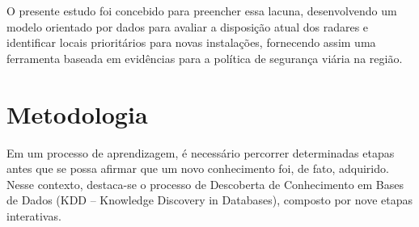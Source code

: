 \documentclass[12pt]{article}
\begin{document}
O presente estudo foi concebido para preencher essa lacuna, desenvolvendo um modelo orientado por dados para avaliar a disposição atual dos radares e identificar locais prioritários para novas instalações, fornecendo assim uma ferramenta baseada em evidências para a política de segurança viária na região.




\section{Metodologia}
Em um processo de aprendizagem, é necessário percorrer determinadas etapas antes que se possa afirmar que um novo conhecimento foi, de fato, adquirido. Nesse contexto, destaca-se o processo de Descoberta de Conhecimento em Bases de Dados (KDD – Knowledge Discovery in Databases), composto por nove etapas interativas.
\end{document}
